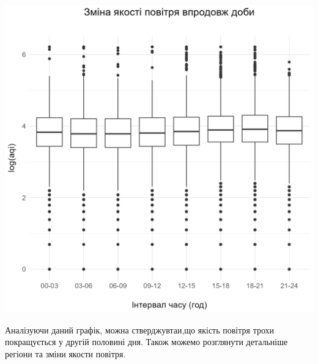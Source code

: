 \documentclass{article}
\begin{document}
\begin{enumerate}
    \begin{center}
    \includegraphics[width=6in]{question3/box.png}
    \end{center}
    Аналізуючи даний графік, можна стверджувтаи,що якість повітря трохи покращується у другій половині дня.
    Також можемо розглянути детальніше регіони та зміни якости повітря. 
    

\end{enumerate}
\end{document}
